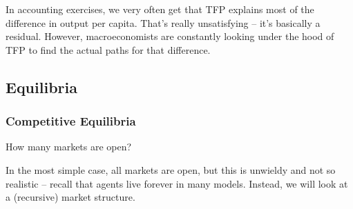 \documentclass[10pt]{article}
\begin{document}
\begin{remark}
	In accounting exercises, we very often get that TFP explains most of the difference in output per capita. That's really unsatisfying -- it's basically a residual. However, macroeconomists are constantly looking under the hood of TFP to find the actual paths for that difference.
\end{remark}

\subsection{Equilibria}

\subsubsection{Competitive Equilibria}

\begin{question}
	How many markets are open?
\end{question}
In the most simple case, all markets are open, but this is unwieldy and not so realistic -- recall that agents live forever in many models. Instead, we will look at a (recursive) market structure.
\end{document}
